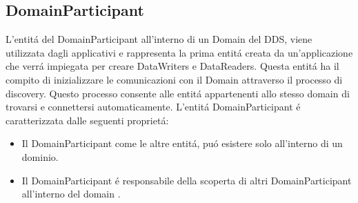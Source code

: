 
\subsection{DomainParticipant}
L'entitá del DomainParticipant all'interno di un Domain del DDS,
viene utilizzata dagli applicativi e 
rappresenta la prima entitá creata da un'applicazione che verrá 
impiegata per creare DataWriters e DataReaders. 
Questa entitá ha il compito di inizializzare
le comunicazioni con il Domain attraverso 
il processo di discovery.
Questo processo consente alle entitá appartenenti allo 
stesso domain di trovarsi e connettersi automaticamente.
L'entitá DomainParticipant é caratterizzata dalle seguenti proprietá:
\begin{itemize}
    \item Il DomainParticipant come le altre entitá, puó 
    esistere solo all'interno di un dominio.
    \item Il DomainParticipant é responsabile della scoperta di altri
    DomainParticipant all'interno del domain \cite{domainparticipantrti}.
\end{itemize}


